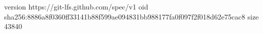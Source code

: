 version https://git-lfs.github.com/spec/v1
oid sha256:8886a8f0360ff33141b88f599ae094831bb988177fa0f097f2f018d62e75cac8
size 43840
